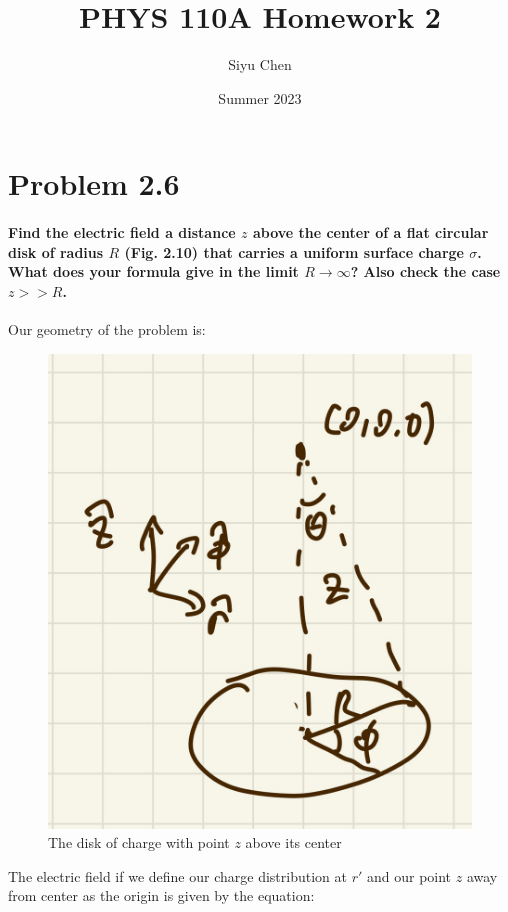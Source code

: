 \documentclass{article}
\title{PHYS 110A Homework 2}
\author{Siyu Chen}
\date{Summer 2023}
\numberwithin{equation}{section}
\numberwithin{figure}{section}
\begin{document}
\maketitle

\section{Problem 2.6}

\paragraph{Find the electric field a distance $z$ above the center of a flat circular disk of radius $R$ (Fig. 2.10) that carries a uniform surface charge $\sigma$. What does your formula give in the limit $R \to \infty$? Also check the case $z >> R$. \\}

Our geometry of the problem is:
\begin{figure}[!htb]
    \centering
   \begin{minipage}{0.48\textwidth}
     \includegraphics[width=0.8\linewidth]{hw/hw2/1.1.jpg}
     \caption{The disk of charge with point $z$ above its center}
   \end{minipage}
\end{figure}

The electric field if we define our charge distribution at $r'$ and our point $z$ away from center as the origin is given by the equation:
\end{document}
